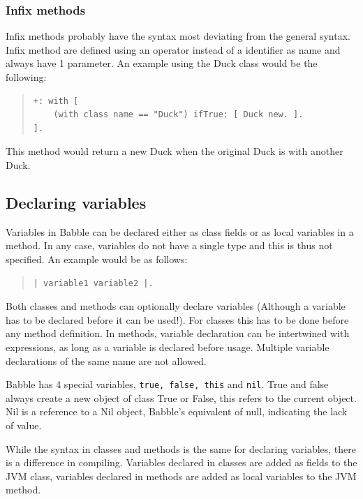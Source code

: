 \documentclass[a4paper]{article}
\begin{document}
\subsubsection{Infix methods}

Infix methods probably have the syntax most deviating from the general syntax. Infix method are defined using an operator instead of a identifier as name and always have 1 parameter. An example using the Duck class would be the following:

\begin{quote}
\begin{lstlisting}
+: with [
	(with class name == "Duck") ifTrue: [ Duck new. ].
].
\end{lstlisting}
\end{quote}
This method would return a new Duck when the original Duck is with another Duck.

\subsection{Declaring variables}
Variables in Babble can be declared either as class fields or as local variables in a method. In any case, variables do not have a single type and this is thus not specified. An example would be as follows:
\begin{quote}
\begin{lstlisting}
| variable1 variable2 |.
\end{lstlisting}
\end{quote}

Both classes and methods can optionally declare variables (Although a variable has to be declared before it can be used!). For classes this has to be done before any method definition. In methods, variable declaration can be intertwined with expressions, as long as a variable is declared before usage. Multiple variable declarations of the same name are not allowed.

Babble has 4 special variables, \texttt{true, false, this} and \texttt{nil}. True and false always create a new object of class True or False, this refers to the current object. Nil is a reference to a Nil object, Babble's equivalent of null, indicating the lack of value.

While the syntax in classes and methods is the same for declaring variables, there is a difference in compiling. Variables declared in classes are added as fields to the JVM class, variables declared in methods are added as local variables to the JVM method.
\end{document}
